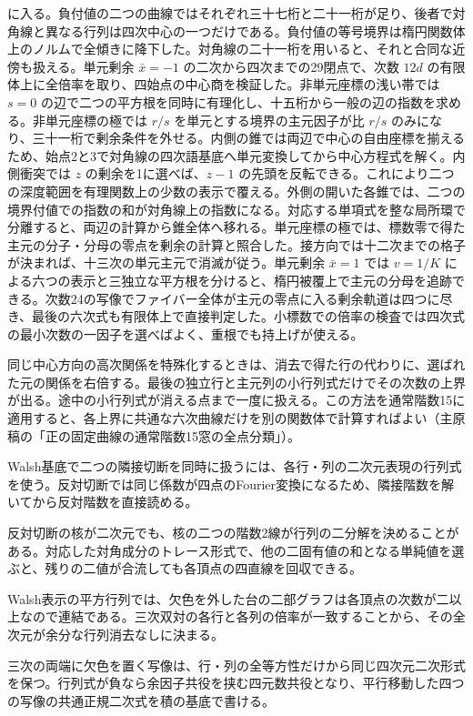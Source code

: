 \documentclass[11pt,a4paper]{ltjsarticle}
\begin{document}
に入る。負付値の二つの曲線ではそれぞれ三十七桁と二十一桁が足り、後者で対角線と異なる行列は四次中心の一つだけである。負付値の等号境界は楕円関数体上のノルムで全傾きに降下した。対角線の二十一桁を用いると、それと合同な近傍も扱える。単元剰余 $\bar x=-1$ の二次から四次までの29閉点で、次数 $12d$ の有限体上に全倍率を取り、四始点の中心商を検証した。非単元座標の浅い帯では $s=0$ の辺で二つの平方根を同時に有理化し、十五桁から一般の辺の指数を求める。非単元座標の極では $r/s$ を単元とする境界の主元因子が比 $r/s$ のみになり、三十一桁で剰余条件を外せる。内側の錐では両辺で中心の自由座標を揃えるため、始点2と3で対角線の四次語基底へ単元変換してから中心方程式を解く。内側衝突では $z$ の剰余を1に選べば、$z-1$ の先頭を反転できる。これにより二つの深度範囲を有理関数上の少数の表示で覆える。外側の開いた各錐では、二つの境界付値での指数の和が対角線上の指数になる。対応する単項式を整な局所環で分離すると、両辺の計算から錐全体へ移れる。単元座標の極では、標数零で得た主元の分子・分母の零点を剰余の計算と照合した。接方向では十二次までの格子が決まれば、十三次の単元主元で消滅が従う。単元剰余 $\bar x=1$ では $v=1/K$ による六つの表示と三独立な平方根を分けると、楕円被覆上で主元の分母を追跡できる。次数24の写像でファイバー全体が主元の零点に入る剰余軌道は四つに尽き、最後の六次式も有限体上で直接判定した。小標数での倍率の検査では四次式の最小次数の一因子を選べばよく、重根でも持上げが使える。

同じ中心方向の高次関係を特殊化するときは、消去で得た行の代わりに、選ばれた元の関係を右倍する。最後の独立行と主元列の小行列式だけでその次数の上界が出る。途中の小行列式が消える点まで一度に扱える。この方法を通常階数15に適用すると、各上界に共通な六次曲線だけを別の関数体で計算すればよい（主原稿の「正の固定曲線の通常階数15窓の全点分類」）。

Walsh基底で二つの隣接切断を同時に扱うには、各行・列の二次元表現の行列式を使う。反対切断では同じ係数が四点のFourier変換になるため、隣接階数を解いてから反対階数を直接読める。

反対切断の核が二次元でも、核の二つの階数2線が行列の二分解を決めることがある。対応した対角成分のトレース形式で、他の二固有値の和となる単純値を選ぶと、残りの二値が合流しても各頂点の四直線を回収できる。

Walsh表示の平方行列では、欠色を外した台の二部グラフは各頂点の次数が二以上なので連結である。三次双対の各行と各列の倍率が一致することから、その全次元が余分な行列消去なしに決まる。

三次の両端に欠色を置く写像は、行・列の全等方性だけから同じ四次元二次形式を保つ。行列式が負なら余因子共役を挟む四元数共役となり、平行移動した四つの写像の共通正規二次式を積の基底で書ける。
\end{document}
